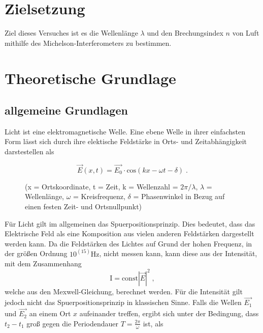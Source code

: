 \section{Zielsetzung}
    Ziel dieses Versuches ist es die Wellenlänge $\lambda$ und den Brechungsindex $n$ von Luft mithilfe des Michelson-Interferometers zu bestimmen.

\section{Theoretische Grundlage}
\noindent
\subsection{allgemeine Grundlagen}
Licht ist eine elektromagnetische Welle. Eine ebene Welle in ihrer einfachsten Form lässt sich durch ihre elektische Feldstärke in Orts- und Zeitabhängigkeit darstestellen als
\begin{figure}
    \[   \vec{E}(x, t) = \vec{E_0} \cdot \text{cos}(kx - \omega t - \delta) \;. \]
    \caption{(x = Ortskoordinate, t = Zeit, k = Wellenzahl = $2 \pi/\lambda$, $\lambda$ = Wellenlänge, $\omega$ = Kreisfrequenz, $\delta$ = Phasenwinkel in Bezug auf einen festen Zeit- und Ortsnullpunkt)}
    \label{eqn:ansatz}
\end{figure}
\noindent
Für Licht gilt im allgemeinen das Spuerpositionsprinzip. Dies bedeutet, dass das Elektrische Feld als eine Komposition aus vielen anderen Feldstärken dargestellt werden kann.
Da die Feldstärken des Lichtes auf Grund der hohen Frequenz, in der größen Ordnung $10^(15) \si{\hertz}$, nicht messen kann, kann diese aus der Intensität, mit dem Zusammenhang
\begin{equation*}
    \text{I} = \text{const} |\vec{E}|^2 \; ,
    \label{eqn:Int}
\end{equation*}
\noindent
welche aus den Mexwell-Gleichung, berechnet werden. Für die Intensität gilt jedoch nicht das Spuerpositionsprinzip in klassischen Sinne. Falls die Wellen $\vec{E_1}$ und $\vec{E_2}$ 
an einem Ort $x$  aufeinander treffen, ergibt sich unter der Bedingung, dass $t_2 - t_1$ groß gegen die Periodendauer $T = \frac{2 \pi}{\omega}$ ist, als

